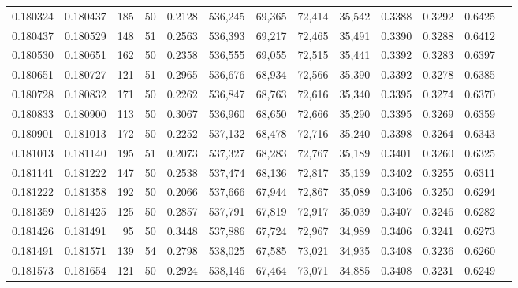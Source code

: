 \begin{tabular}{rrrrrrrrrrrrr}
0.180324 & 0.180437 &   185 &  50 &                                     0.2128 & 536,245 &  69,365 &  72,414 &  35,542 & 0.3388 & 0.3292 & 0.6425 \\
0.180437 & 0.180529 &   148 &  51 &                                     0.2563 & 536,393 &  69,217 &  72,465 &  35,491 & 0.3390 & 0.3288 & 0.6412 \\
0.180530 & 0.180651 &   162 &  50 &                                     0.2358 & 536,555 &  69,055 &  72,515 &  35,441 & 0.3392 & 0.3283 & 0.6397 \\
0.180651 & 0.180727 &   121 &  51 &                                     0.2965 & 536,676 &  68,934 &  72,566 &  35,390 & 0.3392 & 0.3278 & 0.6385 \\
0.180728 & 0.180832 &   171 &  50 &                                     0.2262 & 536,847 &  68,763 &  72,616 &  35,340 & 0.3395 & 0.3274 & 0.6370 \\
0.180833 & 0.180900 &   113 &  50 &                                     0.3067 & 536,960 &  68,650 &  72,666 &  35,290 & 0.3395 & 0.3269 & 0.6359 \\
0.180901 & 0.181013 &   172 &  50 &                                     0.2252 & 537,132 &  68,478 &  72,716 &  35,240 & 0.3398 & 0.3264 & 0.6343 \\
0.181013 & 0.181140 &   195 &  51 &                                     0.2073 & 537,327 &  68,283 &  72,767 &  35,189 & 0.3401 & 0.3260 & 0.6325 \\
0.181141 & 0.181222 &   147 &  50 &                                     0.2538 & 537,474 &  68,136 &  72,817 &  35,139 & 0.3402 & 0.3255 & 0.6311 \\
0.181222 & 0.181358 &   192 &  50 &                                     0.2066 & 537,666 &  67,944 &  72,867 &  35,089 & 0.3406 & 0.3250 & 0.6294 \\
0.181359 & 0.181425 &   125 &  50 &                                     0.2857 & 537,791 &  67,819 &  72,917 &  35,039 & 0.3407 & 0.3246 & 0.6282 \\
0.181426 & 0.181491 &    95 &  50 &                                     0.3448 & 537,886 &  67,724 &  72,967 &  34,989 & 0.3406 & 0.3241 & 0.6273 \\
0.181491 & 0.181571 &   139 &  54 &                                     0.2798 & 538,025 &  67,585 &  73,021 &  34,935 & 0.3408 & 0.3236 & 0.6260 \\
0.181573 & 0.181654 &   121 &  50 &                                     0.2924 & 538,146 &  67,464 &  73,071 &  34,885 & 0.3408 & 0.3231 & 0.6249 \\

\end{tabular}
